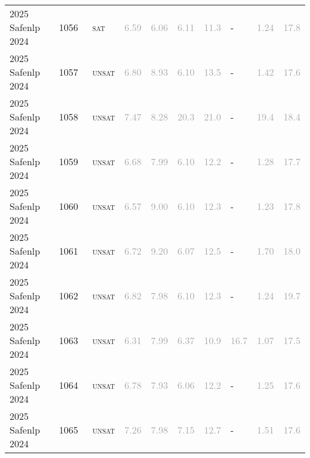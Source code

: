 \begin{center}
{\begin{longtable}{@{}llllllllll@{}}
2025 Safenlp 2024 & 1056 & ~\textsc{sat} & \textcolor{darkgray}{6.59} & \textcolor{darkgray}{6.06} & \textcolor{darkgray}{6.11} & \textcolor{darkgray}{11.3} & - & \textcolor{darkgray}{1.24} & \textcolor{darkgray}{17.8} \\
2025 Safenlp 2024 & 1057 & ~\textsc{unsat} & \textcolor{darkgray}{6.80} & \textcolor{darkgray}{8.93} & \textcolor{darkgray}{6.10} & \textcolor{darkgray}{13.5} & - & \textcolor{darkgray}{1.42} & \textcolor{darkgray}{17.6} \\
2025 Safenlp 2024 & 1058 & ~\textsc{unsat} & \textcolor{darkgray}{7.47} & \textcolor{darkgray}{8.28} & \textcolor{darkgray}{20.3} & \textcolor{darkgray}{21.0} & - & \textcolor{darkgray}{19.4} & \textcolor{darkgray}{18.4} \\
2025 Safenlp 2024 & 1059 & ~\textsc{unsat} & \textcolor{darkgray}{6.68} & \textcolor{darkgray}{7.99} & \textcolor{darkgray}{6.10} & \textcolor{darkgray}{12.2} & - & \textcolor{darkgray}{1.28} & \textcolor{darkgray}{17.7} \\
2025 Safenlp 2024 & 1060 & ~\textsc{unsat} & \textcolor{darkgray}{6.57} & \textcolor{darkgray}{9.00} & \textcolor{darkgray}{6.10} & \textcolor{darkgray}{12.3} & - & \textcolor{darkgray}{1.23} & \textcolor{darkgray}{17.8} \\
2025 Safenlp 2024 & 1061 & ~\textsc{unsat} & \textcolor{darkgray}{6.72} & \textcolor{darkgray}{9.20} & \textcolor{darkgray}{6.07} & \textcolor{darkgray}{12.5} & - & \textcolor{darkgray}{1.70} & \textcolor{darkgray}{18.0} \\
2025 Safenlp 2024 & 1062 & ~\textsc{unsat} & \textcolor{darkgray}{6.82} & \textcolor{darkgray}{7.98} & \textcolor{darkgray}{6.10} & \textcolor{darkgray}{12.3} & - & \textcolor{darkgray}{1.24} & \textcolor{darkgray}{19.7} \\
2025 Safenlp 2024 & 1063 & ~\textsc{unsat} & \textcolor{darkgray}{6.31} & \textcolor{darkgray}{7.99} & \textcolor{darkgray}{6.37} & \textcolor{darkgray}{10.9} & \textcolor{darkgray}{16.7} & \textcolor{darkgray}{1.07} & \textcolor{darkgray}{17.5} \\
2025 Safenlp 2024 & 1064 & ~\textsc{unsat} & \textcolor{darkgray}{6.78} & \textcolor{darkgray}{7.93} & \textcolor{darkgray}{6.06} & \textcolor{darkgray}{12.2} & - & \textcolor{darkgray}{1.25} & \textcolor{darkgray}{17.6} \\
2025 Safenlp 2024 & 1065 & ~\textsc{unsat} & \textcolor{darkgray}{7.26} & \textcolor{darkgray}{7.98} & \textcolor{darkgray}{7.15} & \textcolor{darkgray}{12.7} & - & \textcolor{darkgray}{1.51} & \textcolor{darkgray}{17.6} \\

\end{longtable}}
\end{center}
